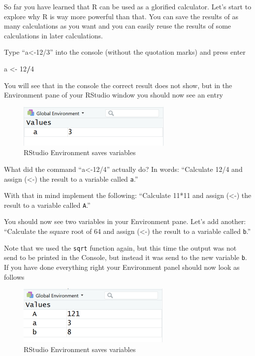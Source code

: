 \documentclass[
]{article}
\newenvironment{Shaded}{\begin{snugshade}}{\end{snugshade}}
\newcommand{\DecValTok}[1]{\textcolor[rgb]{0.00,0.00,0.81}{#1}}
\newcommand{\NormalTok}[1]{#1}
\newcommand{\OtherTok}[1]{\textcolor[rgb]{0.56,0.35,0.01}{#1}}
\newcommand{\SpecialCharTok}[1]{\textcolor[rgb]{0.81,0.36,0.00}{\textbf{#1}}}
\begin{document}
So far you have learned that R can be used as a glorified calculator.
Let's start to explore why R is way more powerful than that. You can
save the results of as many calculations as you want and you can easily
reuse the results of some calculations in later calculations.

Type ``a\textless-12/3'' into the console (without the quotation marks)
and press enter

\begin{Shaded}
\begin{Highlighting}[]
\NormalTok{a }\OtherTok{\textless{}{-}} \DecValTok{12}\SpecialCharTok{/}\DecValTok{4}
\end{Highlighting}
\end{Shaded}

You will see that in the console the correct result does not show, but
in the Environment pane of your RStudio window you should now see an
entry

\begin{figure}
\centering
\includegraphics{RStudio_Env.png}
\caption{RStudio Environment saves variables}
\end{figure}

What did the command ``a\textless-12/4'' actually do? In words:
``Calculate 12/4 and assign (\textless-) the result to a variable called
\texttt{a}.''

With that in mind implement the following: ``Calculate 11*11 and assign
(\textless-) the result to a variable called \texttt{A}.''

You should now see two variables in your Environment pane. Let's add
another: ``Calculate the square root of 64 and assign (\textless-) the
result to a variable called \texttt{b}.''

Note that we used the \texttt{sqrt} function again, but this time the
output was not send to be printed in the Console, but instead it was
send to the new variable \texttt{b}. If you have done everything right
your Environment panel should now look as follows

\begin{figure}
\centering
\includegraphics{RStudio_Env2.png}
\caption{RStudio Environment saves variables}
\end{figure}
\end{document}
